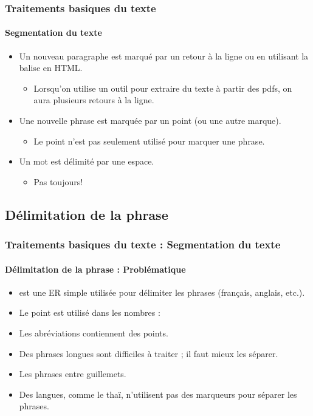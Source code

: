 \documentclass[xcolor=table]{beamer}
\begin{document}
\begin{frame}
\frametitle{Traitements basiques du texte}
\framesubtitle{Segmentation du texte}

\begin{itemize}
	\item Un nouveau paragraphe est marqué par un retour à la ligne ou en utilisant la balise  en HTML.
	\begin{itemize}
		\item Lorsqu'on utilise un outil pour extraire du texte à partir des pdfs, on aura plusieurs retours à la ligne. 
	\end{itemize}
	\item Une nouvelle phrase est marquée par un point (ou une autre marque).
	\begin{itemize}
		\item Le point n'est pas seulement utilisé pour marquer une phrase.
	\end{itemize}
	\item Un mot est délimité par une espace.
	\begin{itemize}
		\item Pas toujours!
	\end{itemize}
\end{itemize}

\end{frame}

\subsection{Délimitation de la phrase}

\begin{frame}
\frametitle{Traitements basiques du texte : Segmentation du texte}
\framesubtitle{Délimitation de la phrase : Problématique} 

\begin{itemize}
	\item \expword{/[.?!]/} est une ER simple utilisée pour délimiter les phrases (français, anglais, etc.).
	\item Le point est utilisé dans les nombres : 
	\item Les abréviations contiennent des points.
	\item Des phrases longues sont difficiles à traiter ; il faut mieux les séparer.
	\item Les phrases entre guillemets.
	\item Des langues, comme le thaï, n'utilisent pas des marqueurs pour séparer les phrases.
\end{itemize}

\end{frame}
\end{document}
